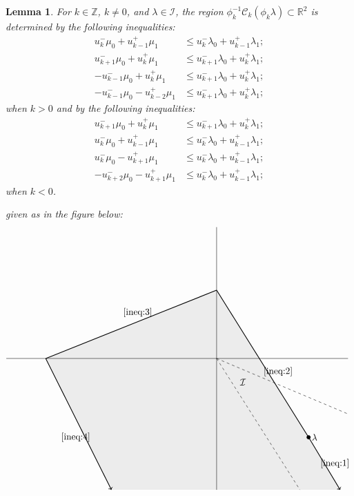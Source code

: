 \documentclass{amsart}
\newtheorem{lemma}[theorem]{Lemma}
\numberwithin{theorem}{section}
\newcommand{\cC}{\mathcal{C}}
\newcommand{\cI}{\mathcal{I}}
\newcommand{\RR}{\mathbb{R}}
\newcommand{\ZZ}{\mathbb{Z}}
\begin{document}
  \begin{lemma}
    \label{le:dominance inequalities}
    For $k\in\ZZ$, $k\ne0$, and $\lambda\in\cI$, the region $\phi_k^{-1}\cC_k(\phi_k\lambda)\subset\RR^2$ is determined by the following inequalities:
    \begin{align}
      \label{ineq:1} u_k^-\mu_0+u_{k-1}^+\mu_1 &\le u_k^-\lambda_0+u_{k-1}^+\lambda_1;\\
      \label{ineq:2} u_{k+1}^-\mu_0+u_k^+\mu_1 &\le u_{k+1}^-\lambda_0+u_k^+\lambda_1;\\
      \label{ineq:3} -u_{k-1}^-\mu_0+u_k^+\mu_1 &\le u_{k+1}^-\lambda_0+u_k^+\lambda_1;\\
      \label{ineq:4} -u_{k-1}^-\mu_0-u_{k-2}^+\mu_1 &\le u_{k+1}^-\lambda_0+u_k^+\lambda_1;
    \end{align}
    when $k>0$ and by the following inequalities:
    \begin{align*}
      u_{k+1}^-\mu_0+u_k^+\mu_1 &\le u_{k+1}^-\lambda_0+u_k^+\lambda_1;\\
      u_k^-\mu_0+u_{k-1}^+\mu_1 &\le u_k^-\lambda_0+u_{k-1}^+\lambda_1;\\
      u_k^-\mu_0-u_{k+1}^+\mu_1 &\le u_k^-\lambda_0+u_{k-1}^+\lambda_1;\\
      -u_{k+2}^-\mu_0-u_{k+1}^+\mu_1 &\le u_k^-\lambda_0+u_{k-1}^+\lambda_1;
    \end{align*}
    when $k<0$.
    
    given as in the figure below:
    \[
      \begin{tikzpicture}
        \filldraw[color=lightgray!30] (47/10,-5) --(3.5,-3) -- (0,26/10) -- (-26/4,0) -- (-16/4,-5);
        \draw[-] (-8,0) -- (5,0);
        \draw[-] (0,-5) -- (0,5);
        \draw[dashed] (0,0) -- (5,-2.113);
        \draw[dashed] (0,0) -- (3.17,-5);
        \node at (1,-0.9) {$\cI$};
        \draw[fill=black] (3.5,-3) circle (2pt);
        \node[right] at (3.5,-3) {$\lambda$};
        \draw[->,thick] (3.5,-3) -- (47/10,-5);
        \draw[-,thick] (3.5,-3) -- (0,26/10);
        \draw[-,thick] (0,26/10) -- (-26/4,0);
        \draw[->,thick] (-26/4,0) -- (-16/4,-5);
        \node at (4.5,-4) {\eqref{ineq:1}};
        \node at (2.34,-0.5) {\eqref{ineq:2}};
        \node at (-3,1.75) {\eqref{ineq:3}};
        \node at (-5.36,-3) {\eqref{ineq:4}};
      \end{tikzpicture}
    \]
  \end{lemma}
\end{document}
